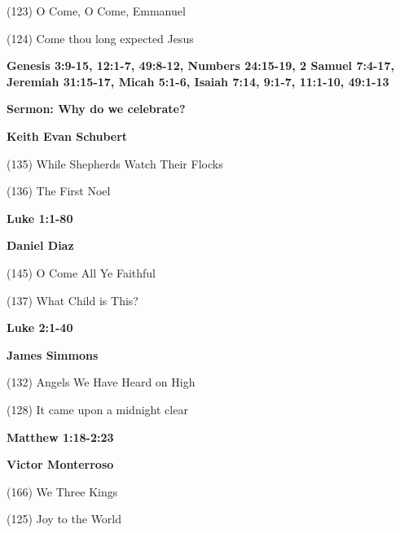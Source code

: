 \documentclass{article}
\begin{document}
\begin{center}
\textbf{}
\vspace{.1in}

{}
\end{center}
\vspace{.3in}









\thispagestyle{empty}


{\Large

(123) O Come, O Come, Emmanuel

(124) Come thou long expected Jesus


\vspace{.1in}
\noindent\textbf{Genesis 3:9-15, 12:1-7, 49:8-12,
Numbers 24:15-19, 2 Samuel 7:4-17, Jeremiah 31:15-17, Micah 5:1-6, Isaiah 7:14, 9:1-7, 11:1-10, 49:1-13}

\vspace{.1in}
\noindent\textbf{Sermon: Why do we celebrate?}

\noindent\textbf{Keith Evan Schubert}
\vspace{.1in}

(135) While Shepherds Watch Their Flocks

(136) The First Noel


\vspace{.1in}
\noindent\textbf{Luke 1:1-80}

\noindent\textbf{Daniel Diaz}
\vspace{.1in}

(145) O Come All Ye Faithful

(137) What Child is This?


\vspace{.1in}
\noindent\textbf{Luke 2:1-40}

\noindent\textbf{James Simmons}
\vspace{.1in}

(132) Angels We Have Heard on High

(128) It came upon a midnight clear

\vspace{.1in}
\noindent\textbf{Matthew 1:18-2:23}

\noindent\textbf{Victor Monterroso}
\vspace{.1in}

(166) We Three Kings

(125) Joy to the World

}
\end{document}
